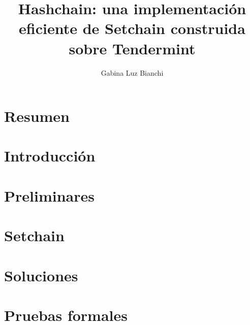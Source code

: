 \documentclass[a4paper, 11pt]{book}
\title{Hashchain: una implementación eficiente de Setchain construida sobre Tendermint}
\author{Gabina Luz Bianchi}
\begin{document}
\frontmatter %



\chapter{Resumen}


\tableofcontents{}

\mainmatter %

\begin{sloppypar}

% 

\chapter{Introducción}\label{chapter:introduction}


\chapter{Preliminares}\label{chapter:prelimnaries}


\chapter{Setchain}\label{chapter:setchain}


\chapter{Soluciones}\label{chapter:sol}


\chapter{Pruebas formales}\label{chapter:proofs}



\end{sloppypar}
\end{document}
